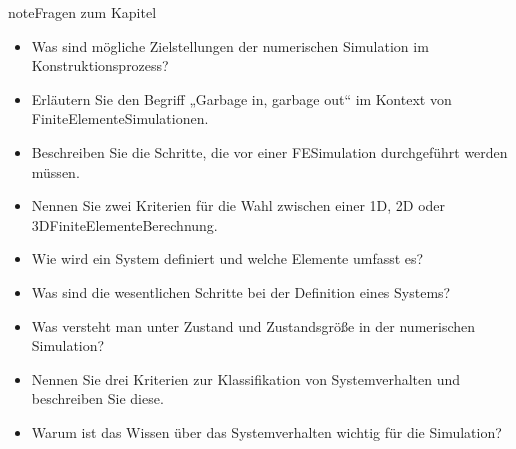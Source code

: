 \documentclass[letterpaper,10pt,german]{jupyterBook}
\begin{document}
\begin{sphinxadmonition}{note}{Fragen zum Kapitel}

\sphinxAtStartPar
{}
\begin{itemize}
\item {} 
\sphinxAtStartPar
Was sind mögliche Zielstellungen der numerischen Simulation im Konstruktionsprozess?

\item {} 
\sphinxAtStartPar
Erläutern Sie den Begriff „Garbage in, garbage out“ im Kontext von Finite\sphinxhyphen{}Elemente\sphinxhyphen{}Simulationen.

\item {} 
\sphinxAtStartPar
Beschreiben Sie die Schritte, die vor einer FE\sphinxhyphen{}Simulation durchgeführt werden müssen.

\item {} 
\sphinxAtStartPar
Nennen Sie zwei Kriterien für die Wahl zwischen einer 1D\sphinxhyphen{}, 2D\sphinxhyphen{} oder 3D\sphinxhyphen{}Finite\sphinxhyphen{}Elemente\sphinxhyphen{}Berechnung.

\end{itemize}

\sphinxAtStartPar
{}
\begin{itemize}
\item {} 
\sphinxAtStartPar
Wie wird ein System definiert und welche Elemente umfasst es?

\item {} 
\sphinxAtStartPar
Was sind die wesentlichen Schritte bei der Definition eines Systems?

\item {} 
\sphinxAtStartPar
Was versteht man unter Zustand und Zustandsgröße in der numerischen Simulation?

\end{itemize}

\sphinxAtStartPar
{}
\begin{itemize}
\item {} 
\sphinxAtStartPar
Nennen Sie drei Kriterien zur Klassifikation von Systemverhalten und beschreiben Sie diese.

\item {} 
\sphinxAtStartPar
Warum ist das Wissen über das Systemverhalten wichtig für die Simulation?

\end{itemize}


\end{sphinxadmonition}
\end{document}
